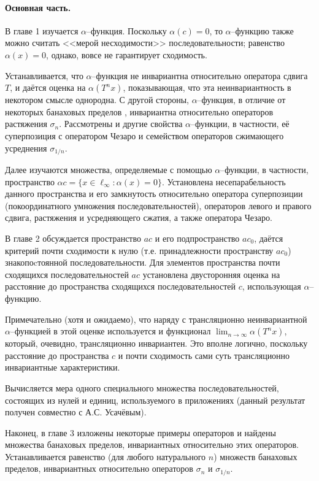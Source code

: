 \documentclass[a4paper,openbib]{report}
\begin{document}
\paragraph{Основная часть.}
В главе 1
изучается $\alpha$--функция.
%
Поскольку $\alpha(c)=0$,
то $\alpha$--функцию также можно считать <<мерой несходимости>> последовательности;
равенство $\alpha(x) = 0$, однако, вовсе не гарантирует сходимость.

Устанавливается, что $\alpha$--функция не инвариантна относительно оператора сдвига $T$,
и даётся оценка на $\alpha(T^n x)$, показывающая,
что эта неинвариантность в некотором смысле однородна.
С другой стороны, $\alpha$--функция, в отличие от некоторых банаховых пределов
\cite{Semenov2010invariant,Semenov2011dan},
инвариантна относительно операторов растяжения $\sigma_n$.
Рассмотрены и другие свойства $\alpha$--функции, в частности,
её суперпозиция с оператором Чезаро и семейством операторов сжимающего усреднения $\sigma_{1/n}$.

Далее изучаются множества, определяемые с помощью $\alpha$--функции, в частности,
пространство $\alpha c = \{x\in\ell_\infty: \alpha(x)=0\}$.
Установлена несепарабельность данного пространства и его замкнутость относительно оператора суперпозиции
(покоординатного умножения последовательностей), операторов левого и правого сдвига,
растяжения и усредняющего сжатия, а также оператора Чезаро.

В главе 2 обсуждается пространство $ac$ и его подпространство $ac_0$,
даётся критерий почти сходимости к нулю (т.е. принадлежности пространству $ac_0$)
знакопоcтоянной последовательности.
Для элементов пространства почти сходящихся последовательностей $ac $
установлена двусторонняя оценка на расстояние до пространства сходящихся последовательностей $c$,
использующая $\alpha$--функцию.

Примечательно (хотя и ожидаемо), что наряду с трансляционно неинвариантной $\alpha$--функцией
в этой оценке используется и функционал $\lim_{n\to\infty}\alpha(T^n x)$,
который, очевидно, трансляционно инвариантен.
Это вполне логично, поскольку расстояние до пространства $c$ и почти сходимость
сами суть трансляционно инвариантные характеристики.

Вычисляется мера одного специального множества последовательностей,
состоящих из нулей и единиц, используемого в приложениях
(данный результат получен совместно с А.С. Усачёвым).

Наконец, в главе 3 изложены некоторые примеры операторов и найдены множества банаховых пределов,
инвариантных относительно этих операторов.
Устанавливается равенство (для любого натурального $n$) множеств банаховых пределов,
инвариантных относительно операторов $\sigma_n$ и $\sigma_{1/n}$.
\end{document}
